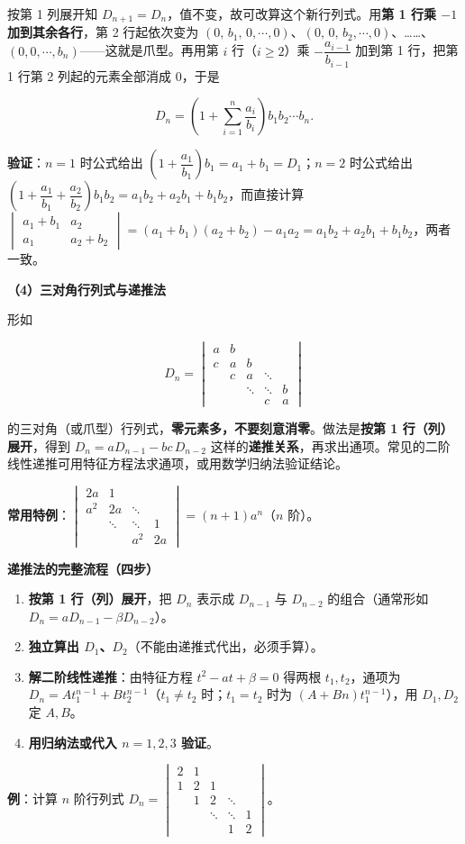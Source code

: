\documentclass[11pt,openany,UTF8]{ctexbook}
\begin{document}
按第 1 列展开知 $D_{n+1}=D_n$，值不变，故可改算这个新行列式。用\textbf{第 1 行乘 $-1$ 加到其余各行}，第 2 行起依次变为 $(0,\,b_1,\,0,\cdots,0)$、$(0,\,0,\,b_2,\cdots,0)$、……、$(0,0,\cdots,b_n)$——这就是爪型。再用第 $i$ 行（$i\ge2$）乘 $-\dfrac{a_{i-1}}{b_{i-1}}$ 加到第 1 行，把第 1 行第 2 列起的元素全部消成 $0$，于是

\[D_n=\left(1+\sum_{i=1}^{n}\frac{a_i}{b_i}\right)b_1b_2\cdots b_n .\]

\textbf{验证}：$n=1$ 时公式给出 $\left(1+\dfrac{a_1}{b_1}\right)b_1=a_1+b_1=D_1$；$n=2$ 时公式给出 $\left(1+\dfrac{a_1}{b_1}+\dfrac{a_2}{b_2}\right)b_1b_2=a_1b_2+a_2b_1+b_1b_2$，而直接计算 $\begin{vmatrix}a_1+b_1&a_2\\a_1&a_2+b_2\end{vmatrix}=(a_1+b_1)(a_2+b_2)-a_1a_2=a_1b_2+a_2b_1+b_1b_2$，两者一致。

\textbf{（4）三对角行列式与递推法}

形如

\[D_n=\begin{vmatrix}a&b&&&\\c&a&b&&\\&c&a&\ddots&\\&&\ddots&\ddots&b\\&&&c&a\end{vmatrix}\]

的三对角（或爪型）行列式，\textbf{零元素多，不要刻意消零}。做法是\textbf{按第 1 行（列）展开}，得到 $D_n=aD_{n-1}-bc\,D_{n-2}$ 这样的\textbf{递推关系}，再求出通项。常见的二阶线性递推可用特征方程法求通项，或用数学归纳法验证结论。

\textbf{常用特例}：$\begin{vmatrix}2a&1&&\\a^2&2a&\ddots&\\&\ddots&\ddots&1\\&&a^2&2a\end{vmatrix}=(n+1)a^n$（$n$ 阶）。

\textbf{递推法的完整流程（四步）}

\begin{enumerate}
\item \textbf{按第 1 行（列）展开}，把 $D_n$ 表示成 $D_{n-1}$ 与 $D_{n-2}$ 的组合（通常形如 $D_n=aD_{n-1}-\beta D_{n-2}$）。
\item \textbf{独立算出 $D_1$、$D_2$}（不能由递推式代出，必须手算）。
\item \textbf{解二阶线性递推}：由特征方程 $t^2-at+\beta=0$ 得两根 $t_1,t_2$，通项为 $D_n=At_1^{n-1}+Bt_2^{n-1}$（$t_1\ne t_2$ 时；$t_1=t_2$ 时为 $(A+Bn)t_1^{n-1}$），用 $D_1,D_2$ 定 $A,B$。
\item \textbf{用归纳法或代入 $n=1,2,3$ 验证}。
\end{enumerate}
\textbf{例}：计算 $n$ 阶行列式 $D_n=\begin{vmatrix}2&1&&&\\1&2&1&&\\&1&2&\ddots&\\&&\ddots&\ddots&1\\&&&1&2\end{vmatrix}$。
\end{document}
